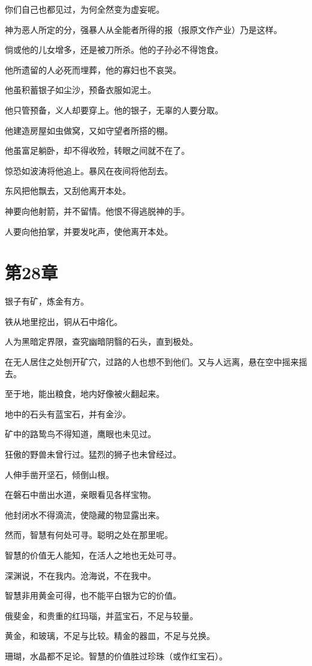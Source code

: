 \documentclass[12pt,oneside]{book}
\begin{document}
你们自己也都见过，为何全然变为虚妄呢。

神为恶人所定的分，强暴人从全能者所得的报（报原文作产业）乃是这样。

倘或他的儿女增多，还是被刀所杀。他的子孙必不得饱食。

他所遗留的人必死而埋葬，他的寡妇也不哀哭。

他虽积蓄银子如尘沙，预备衣服如泥土。

他只管预备，义人却要穿上。他的银子，无辜的人要分取。

他建造房屋如虫做窝，又如守望者所搭的棚。

他虽富足躺卧，却不得收殓，转眼之间就不在了。

惊恐如波涛将他追上。暴风在夜间将他刮去。

东风把他飘去，又刮他离开本处。

神要向他射箭，并不留情。他恨不得逃脱神的手。

人要向他拍掌，并要发叱声，使他离开本处。


\chapter{第28章}
银子有矿，炼金有方。

铁从地里挖出，铜从石中熔化。

人为黑暗定界限，查究幽暗阴翳的石头，直到极处。

在无人居住之处刨开矿穴，过路的人也想不到他们。又与人远离，悬在空中摇来摇去。

至于地，能出粮食，地内好像被火翻起来。

地中的石头有蓝宝石，并有金沙。

矿中的路鸷鸟不得知道，鹰眼也未见过。

狂傲的野兽未曾行过。猛烈的狮子也未曾经过。

人伸手凿开坚石，倾倒山根。

在磐石中凿出水道，亲眼看见各样宝物。

他封闭水不得滴流，使隐藏的物显露出来。

然而，智慧有何处可寻。聪明之处在那里呢。

智慧的价值无人能知，在活人之地也无处可寻。

深渊说，不在我内。沧海说，不在我中。

智慧非用黄金可得，也不能平白银为它的价值。

俄斐金，和贵重的红玛瑙，并蓝宝石，不足与较量。

黄金，和玻璃，不足与比较。精金的器皿，不足与兑换。

珊瑚，水晶都不足论。智慧的价值胜过珍珠（或作红宝石）。
\end{document}
